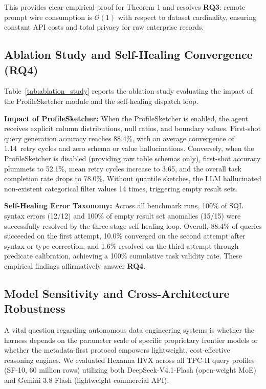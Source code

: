 This provides clear empirical proof for Theorem 1 and resolves \textbf{RQ3}: remote prompt wire consumption is $\mathcal{O}(1)$ with respect to dataset cardinality, ensuring constant API costs and total privacy for raw enterprise records.

\subsection{Ablation Study and Self-Healing Convergence (RQ4)}
Table~\ref{tab:ablation_study} reports the ablation study evaluating the impact of the ProfileSketcher module and the self-healing dispatch loop.



\noindent\textbf{Impact of ProfileSketcher:} When the ProfileSketcher is enabled, the agent receives explicit column distributions, null ratios, and boundary values. First-shot query generation accuracy reaches 88.4\%, with an average convergence of 1.14~retry cycles and zero schema or value hallucinations. Conversely, when the ProfileSketcher is disabled (providing raw table schemas only), first-shot accuracy plummets to 52.1\%, mean retry cycles increase to 3.65, and the overall task completion rate drops to 78.0\%. Without quantile sketches, the LLM hallucinated non-existent categorical filter values 14 times, triggering empty result sets.

\noindent\textbf{Self-Healing Error Taxonomy:} Across all benchmark runs, 100\% of SQL syntax errors (12/12) and 100\% of empty result set anomalies (15/15) were successfully resolved by the three-stage self-healing loop. Overall, 88.4\% of queries succeeded on the first attempt, 10.0\% converged on the second attempt after syntax or type correction, and 1.6\% resolved on the third attempt through predicate calibration, achieving a 100\% cumulative task validity rate. These empirical findings affirmatively answer \textbf{RQ4}.

\subsection{Model Sensitivity and Cross-Architecture Robustness}
A vital question regarding autonomous data engineering systems is whether the harness depends on the parameter scale of specific proprietary frontier models or whether the metadata-first protocol empowers lightweight, cost-effective reasoning engines. We evaluated Hexanna IIVX across all TPC-H query profiles (SF-10, 60 million rows) utilizing both DeepSeek-V4.1-Flash (open-weight MoE) and Gemini 3.8 Flash (lightweight commercial API).

